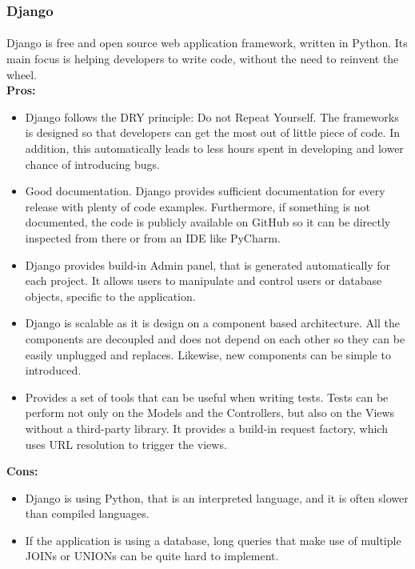 \documentclass{l4proj}
\begin{document}
\subsubsection{Django}
\paragraph{}
Django is free and open source web application framework, written in Python. Its main focus is helping developers to write code, without the need to reinvent the wheel.
\\ \textbf{Pros:}
\begin{itemize}
	\item Django follows the DRY principle: Do not Repeat Yourself. The frameworks is designed so that developers can get the most out of little piece of code. In addition, this automatically leads to less hours spent in developing and lower chance of introducing bugs.
	\item Good documentation. Django provides sufficient documentation for every release with plenty of code examples. Furthermore, if something is not documented, the code is publicly available on GitHub so 
	it can be directly inspected from there or from an IDE like PyCharm. 
	\item Django provides build-in Admin panel, that is generated automatically for each project. It allows users to manipulate and control users or database objects, specific to the application.
	\item Django is scalable as it is design on a component based architecture. All the components are decoupled and does not depend on each other so they can be easily unplugged and replaces. Likewise, new components can be simple to introduced. 
	\item Provides a set of tools that can be useful when writing tests. Tests can be perform not only on the Models and the Controllers, but also on the Views without a third-party library. It provides a build-in request factory, which uses URL resolution to trigger the views. 
\end{itemize}
\textbf{Cons:}
\begin{itemize}
	\item Django is using Python, that is an interpreted language, and it is often slower than compiled languages.  
	\item If the application is using a database, long queries that make use of multiple JOINs or UNIONs can be quite hard to implement.  
\end{itemize}
\end{document}
